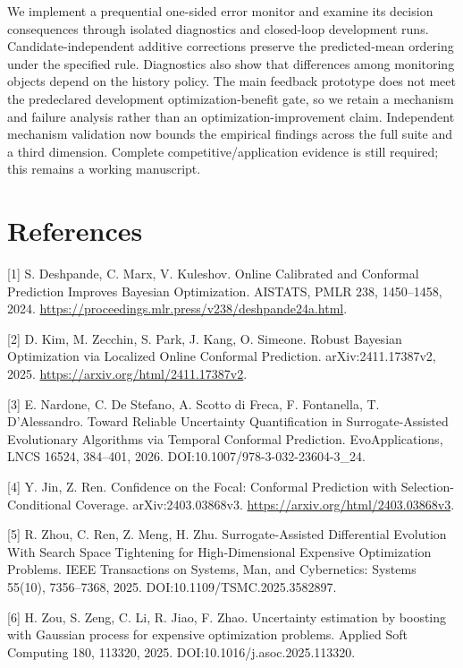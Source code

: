 \documentclass[11pt,a4paper]{article}
\begin{document}
We implement a prequential one-sided error monitor and examine its
decision consequences through isolated diagnostics and closed-loop
development runs. Candidate-independent additive corrections preserve
the predicted-mean ordering under the specified rule. Diagnostics also
show that differences among monitoring objects depend on the history
policy. The main feedback prototype does not meet the predeclared
development optimization-benefit gate, so we retain a mechanism and
failure analysis rather than an optimization-improvement claim.
Independent mechanism validation now bounds the empirical findings
across the full suite and a third dimension. Complete
competitive/application evidence is still required; this remains a
working manuscript.

\hypertarget{references}{%
\section{References}\label{references}}

{[}1{]} S. Deshpande, C. Marx, V. Kuleshov. Online Calibrated and
Conformal Prediction Improves Bayesian Optimization. AISTATS, PMLR 238,
1450--1458, 2024.
\url{https://proceedings.mlr.press/v238/deshpande24a.html}.

{[}2{]} D. Kim, M. Zecchin, S. Park, J. Kang, O. Simeone. Robust
Bayesian Optimization via Localized Online Conformal Prediction.
arXiv:2411.17387v2, 2025. \url{https://arxiv.org/html/2411.17387v2}.

{[}3{]} E. Nardone, C. De Stefano, A. Scotto di Freca, F. Fontanella, T.
D'Alessandro. Toward Reliable Uncertainty Quantification in
Surrogate-Assisted Evolutionary Algorithms via Temporal Conformal
Prediction. EvoApplications, LNCS 16524, 384--401, 2026.
DOI:10.1007/978-3-032-23604-3\_24.

{[}4{]} Y. Jin, Z. Ren. Confidence on the Focal: Conformal Prediction
with Selection-Conditional Coverage. arXiv:2403.03868v3.
\url{https://arxiv.org/html/2403.03868v3}.

{[}5{]} R. Zhou, C. Ren, Z. Meng, H. Zhu. Surrogate-Assisted
Differential Evolution With Search Space Tightening for High-Dimensional
Expensive Optimization Problems. IEEE Transactions on Systems, Man, and
Cybernetics: Systems 55(10), 7356--7368, 2025.
DOI:10.1109/TSMC.2025.3582897.

{[}6{]} H. Zou, S. Zeng, C. Li, R. Jiao, F. Zhao. Uncertainty estimation
by boosting with Gaussian process for expensive optimization problems.
Applied Soft Computing 180, 113320, 2025.
DOI:10.1016/j.asoc.2025.113320.
\end{document}
